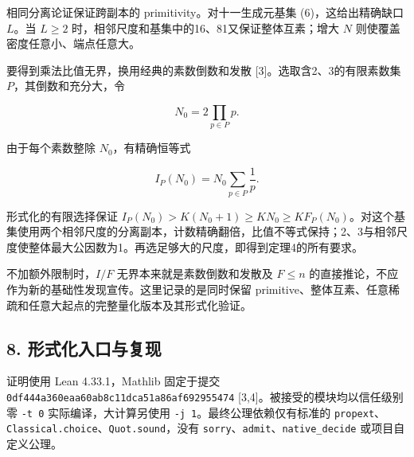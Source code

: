 \documentclass[
  11pt,
]{article}
\begin{document}
相同分离论证保证跨副本的 primitivity。对十一生成元基集
(6)，这给出精确缺口 \(L\)。当 \(L\ge2\)
时，相邻尺度和基集中的16、81又保证整体互素；增大 \(N\)
则使覆盖密度任意小、端点任意大。

要得到乘法比值无界，换用经典的素数倒数和发散
{[}3{]}。选取含2、3的有限素数集 \(P\)，其倒数和充分大，令

\[
N_0=2\prod_{p\in P}p.
\]

由于每个素数整除 \(N_0\)，有精确恒等式

\[
I_P(N_0)=N_0\sum_{p\in P}\frac1p.
\]

形式化的有限选择保证
\(I_P(N_0)>K(N_0+1)\ge KN_0\ge KF_P(N_0)\)。对这个基集使用两个相邻尺度的分离副本，计数精确翻倍，比值不等式保持；2、3与相邻尺度使整体最大公因数为1。再选足够大的尺度，即得到定理4的所有要求。

不加额外限制时，\(I/F\) 无界本来就是素数倒数和发散及 \(F\le n\)
的直接推论，不应作为新的基础性发现宣传。这里记录的是同时保留
primitive、整体互素、任意稀疏和任意大起点的完整量化版本及其形式化验证。

\hypertarget{ux5f62ux5f0fux5316ux5165ux53e3ux4e0eux590dux73b0}{%
\subsection{8.
形式化入口与复现}\label{ux5f62ux5f0fux5316ux5165ux53e3ux4e0eux590dux73b0}}

证明使用 Lean 4.33.1，Mathlib 固定于提交
\texttt{0df444a360\allowbreak{}eaa60ab8c1\allowbreak{}1dca51a86a\allowbreak{}f692955474}
{[}3,4{]}。被接受的模块均以信任级别零 \texttt{-t\ 0}
实际编译，大计算另使用 \texttt{-j\ 1}。最终公理依赖仅有标准的
\texttt{propext}、\texttt{Classical.\allowbreak{}choice}、\texttt{Quot.\allowbreak{}sound}，没有
\texttt{sorry}、\texttt{admit}、\texttt{native\_\allowbreak{}decide}
或项目自定义公理。
\end{document}
